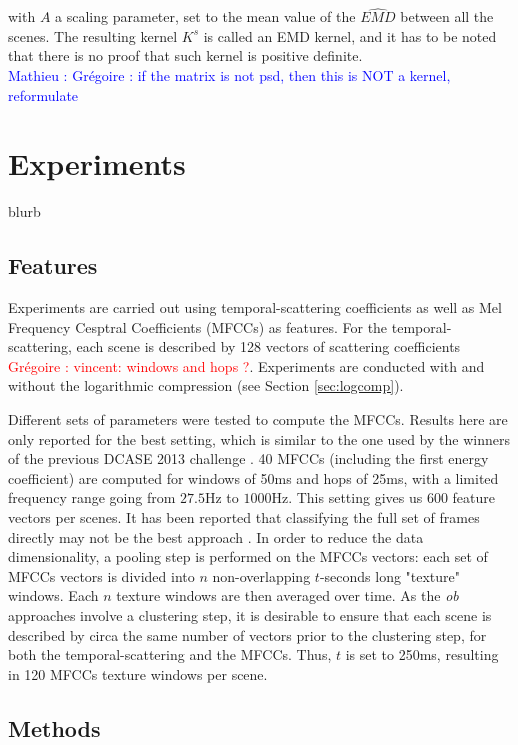\documentclass[journal]{IEEEtran}
\newcommand{\gl}[1]{\textcolor{red}{Gr\'egoire : #1}}
\newcommand{\ml}[1]{\textcolor{blue}{ Mathieu : #1}}
\begin{document}
with $A$ a scaling parameter, set to the mean value of the $\widehat{EMD}$ between all the scenes. The resulting kernel $K^s$ is called an EMD kernel, and it has to be noted that there is no proof that such kernel is positive definite. \\

\ml{Grégoire : if the matrix is not psd, then this is NOT a kernel, reformulate}

\section{Experiments}
\label{sec:ExpEval}

blurb

\subsection{Features}

Experiments are carried out using temporal-scattering coefficients as well as Mel Frequency Cesptral Coefficients (MFCCs) as features. For the temporal-scattering, each scene is described by 128 vectors of scattering coefficients \gl{vincent: windows and hops ?}. Experiments are conducted with and without the logarithmic compression (see Section \ref{sec:logcomp}).

Different sets of parameters were tested to compute the MFCCs. Results here are only reported for the best setting, which is similar to the one used by the winners of the previous DCASE 2013 challenge \cite{roma2013}. 40 MFCCs (including the first energy coefficient) are computed for windows of 50ms and hops of 25ms, with a limited frequency range going from $27.5$Hz to $1000$Hz. This setting gives us 600 feature vectors per scenes. It has been reported that classifying the full set of frames directly may not be the best approach \cite{rakotomamonjy2015histogram}. In order to reduce the data dimensionality, a pooling step is performed on the MFCCs vectors: each set of MFCCs vectors is divided into $n$ non-overlapping $t$-seconds long "texture" windows. Each $n$ texture windows are then averaged over time. As the \emph{ob} approaches involve a clustering step, it is desirable to ensure that each scene is described by circa the same number of vectors prior to the clustering step, for both the temporal-scattering and the MFCCs. Thus, $t$ is set to 250ms, resulting in 120 MFCCs texture windows per scene. 

\subsection{Methods}
\end{document}
